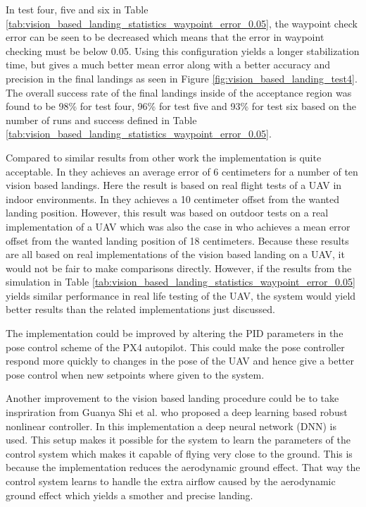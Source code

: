 \documentclass[../Head/report.tex]{subfiles}
\begin{document}
In test four, five and six in Table \ref{tab:vision_based_landing_statistics_waypoint_error_0.05}, the waypoint check error can be seen to be decreased which means that the error in waypoint checking must be below 0.05. Using this configuration yields a longer stabilization time, but gives a much better mean error along with a better accuracy and precision in the final landings as seen in Figure \ref{fig:vision_based_landing_test4}. The overall success rate of the final landings inside of the acceptance region was found to be 98\% for test four, 96\% for test five and 93\% for test six based on the number of runs and success defined in Table \ref{tab:vision_based_landing_statistics_waypoint_error_0.05}. 

Compared to similar results from other work the implementation is quite acceptable. In \cite[p.~5]{AutomaticnavigationandlandingofanindoorAR} they achieves an average error of 6 centimeters for a number of ten vision based landings. Here the result is based on real flight tests of a UAV in indoor environments. In \cite[p.~56]{AutonomousRechargingSystemforDronesTwo} they achieves a 10 centimeter offset from the wanted landing position. However, this result was based on outdoor tests on a real implementation of a UAV which was also the case in \cite[p.~6]{AVisionBasedSystemForAutonomousVerticaLanding} who achieves a mean error offset from the wanted landing position of 18 centimeters. Because these results are all based on real implementations of the vision based landing on a UAV, it would not be fair to make comparisons directly. However, if the results from the simulation in Table \ref{tab:vision_based_landing_statistics_waypoint_error_0.05} yields similar performance in real life testing of the UAV, the system would yield better results than the related implementations just discussed. 

The implementation could be improved by altering the PID parameters in the pose control scheme of the PX4 autopilot. This could make the pose controller respond more quickly to changes in the pose of the UAV and hence give a better pose control when new setpoints where given to the system.    

Another improvement to the vision based landing procedure could be to take inspriration from Guanya Shi et al. \cite{NeuralLander} who proposed a deep
learning based robust nonlinear controller. In this implementation a deep neural network (DNN) is used. This setup makes it possible for the system to learn the parameters of the control system which makes it capable of flying very close to the ground. This is because the implementation reduces the aerodynamic ground effect. That way the control system learns to handle the extra airflow caused by the aerodynamic ground effect which yields a smother and precise landing.  
\end{document}
